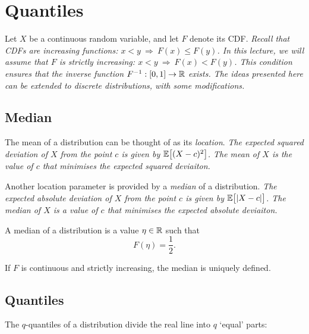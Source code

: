 \chapter{Quantiles}\label{chap:quantiles}

Let $X$ be a continuous random variable, and let $F$ denote its CDF.
\bit
\it Recall that CDFs are \emph{increasing} functions: $x<y \ \Rightarrow\ F(x)\leq F(y)$.
\it In this lecture, we will assume that $F$ is \emph{strictly increasing}: $x<y \ \Rightarrow\ F(x)<F(y)$.
\it This condition ensures that the inverse function $F^{-1}:[0,1]\to\mathbb{R}$ exists.
\it The ideas presented here can be extended to discrete distributions, with some modifications.
\eit


\section{Median}
The mean of a distribution can be thought of as its \emph{location}.
\bit
\it The expected \emph{squared deviation} of $X$ from the point $c$ is given by $\mathbb{E}\big[(X-c)^2\big]$.
\it The mean of $X$ is the value of $c$ that minimises the expected squared deviaiton. 
\eit

\vspace{2ex}
Another location parameter is provided by a \emph{median} of a distribution.
\bit
\it The expected \emph{absolute deviation} of $X$ from the point $c$ is given by $\mathbb{E}\big[|X-c|\big]$.
\it The median of $X$ is a value of $c$ that minimises the expected absolute deviaiton. 
\eit

\begin{definition}
A median of a distribution is a value $\eta\in\mathbb{R}$ such that
\[
\displaystyle F(\eta) = \frac{1}{2}.
\] 
\end{definition}

\begin{remark}
If $F$ is continuous and strictly increasing, the median is uniquely defined.
\end{remark}


\section{Quantiles}
The $q$-quantiles of a distribution divide the real line into $q$ `equal' parts:

